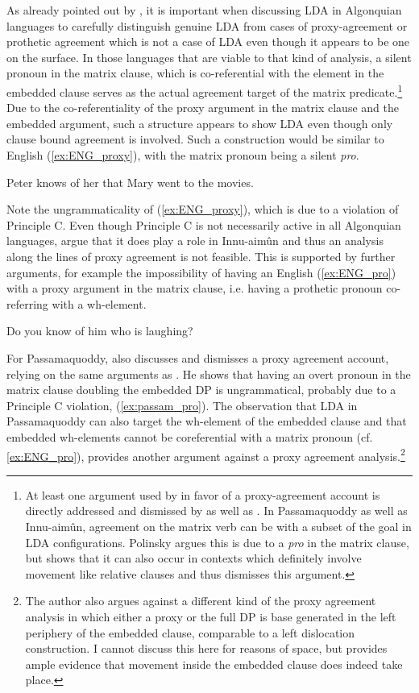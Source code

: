 \documentclass[output=paper
,modfonts
,nonflat]{langsci/langscibook}
\begin{document}
As already pointed out by \citet{Polinsky2003}, it is important when discussing LDA in Algonquian languages to carefully distinguish genuine LDA from cases of proxy-agreement or prothetic agreement which is not a case of LDA even though it appears to be one on the surface. In those languages that are viable to that kind of analysis, a silent pronoun in the matrix clause, which is co-referential with the element in the embedded clause serves as the actual agreement target of the matrix predicate.\footnote{At least one argument used by \citet{Polinsky2003} in favor of a proxy-agreement account is directly addressed and dismissed by \citet{Bruening2001a} as well as \citet{Branigan_MacKenzie2002}. In Passamaquoddy as well as Innu-aim\^{u}n, agreement on the matrix verb can be with a subset of the goal in LDA configurations. Polinsky argues this is due to a \textit{pro} in the matrix clause, but \citet[][269]{Bruening2001a} shows that it can also occur in contexts which definitely involve movement like relative clauses and thus dismisses this argument.} Due to the co-referentiality of the proxy argument in the matrix clause and the embedded argument, such a structure appears to show LDA even though only clause bound agreement is involved. Such a construction would be similar to English (\ref{ex:ENG_proxy}), with the matrix pronoun being a silent \textit{pro}.
\begin{exe}
\ex *Peter knows of her that Mary went to the movies. \label{ex:ENG_proxy}
\end{exe}
Note the ungrammaticality of (\ref{ex:ENG_proxy}), which is due to a violation of Principle C. Even though Principle C is not necessarily active in all Algonquian languages, \citet{Branigan_MacKenzie2002} argue that it does play a role in Innu-aim\^{u}n and thus an analysis along the lines of proxy agreement is not feasible. This is supported by further arguments, for example the impossibility of having an English (\ref{ex:ENG_pro}) with a proxy argument in the matrix clause, i.e. having a prothetic pronoun co-referring with a wh-element.
\begin{exe}
\ex *Do you know of him who is laughing? \label{ex:ENG_pro}
\end{exe}
For Passamaquoddy, \citet{Bruening2001a} also discusses and dismisses a proxy agreement account, relying on the same arguments as \citet{Branigan_MacKenzie2002}. He shows that having an overt pronoun in the matrix clause doubling the embedded DP is ungrammatical, probably due to a Principle C violation, (\ref{ex:passam_pro}). The observation that LDA in Passamaquoddy can also target the wh-element of the embedded clause and that embedded wh-elements cannot be coreferential with a matrix pronoun (cf. \ref{ex:ENG_pro}), provides another argument against a proxy agreement analysis.\footnote{The author also argues against a different kind of the proxy agreement analysis in which either a proxy or the full DP is base generated in the left periphery of the embedded clause, comparable to a left dislocation construction. I cannot discuss this here for reasons of space, but  \citet[][263ff]{Bruening2001a} provides ample evidence that movement inside the embedded clause does indeed take place.}
\end{document}
